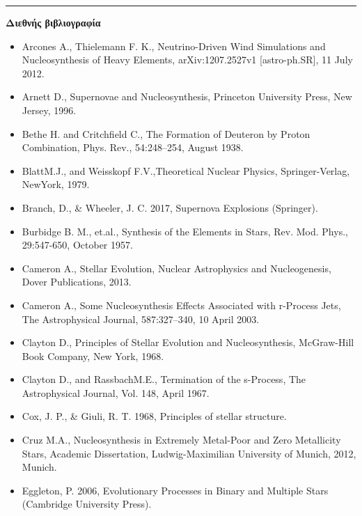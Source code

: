 \hrule
\textbf{Διεθνής βιβλιογραφία}
\begin{itemize}
    
    \item Arcones A., Thielemann F. K., Neutrino-Driven Wind Simulations and Nucleosynthesis of Heavy Elements, arXiv:1207.2527v1 [astro-ph.SR], 11 July 2012.
    
    \item Arnett D., Supernovae and Nucleosynthesis, Princeton University Press, New Jersey, 1996.
    
    \item Bethe H. and Critchfield C., The Formation of Deuteron by Proton Combination, Phys. Rev., 54:248–254, August 1938.
    
    \item BlattM.J., and Weisskopf F.V.,Theoretical Nuclear Physics, Springer-Verlag, NewYork, 1979.
    
    \item Branch, D., \& Wheeler, J. C. 2017, Supernova Explosions (Springer).
    
    \item Burbidge B. M., et.al., Synthesis of the Elements in Stars, Rev. Mod. Phys., 29:547-650, October 1957.
    
    \item Cameron A., Stellar Evolution, Nuclear Astrophysics and Nucleogenesis, Dover Publications, 2013.
    
    \item Cameron A., Some Nucleosynthesis Effects Associated with r-Process Jets, The Astrophysical Journal, 587:327–340, 10 April 2003.
    
    \item Clayton D., Principles of Stellar Evolution and Nucleosynthesis, McGraw-Hill Book Company, New York, 1968.
    
    \item Clayton D., and RassbachM.E., Termination of the s-Process, The Astrophysical Journal, Vol. 148, April 1967.
    
    \item Cox, J. P., \& Giuli, R. T. 1968, Principles of stellar structure.
    
    \item Cruz M.A., Nucleosynthesis in Extremely Metal-Poor and Zero Metallicity Stars, Academic Dissertation, Ludwig-Maximilian University of Munich, 2012, Munich.
    
    \item Eggleton, P. 2006, Evolutionary Processes in Binary and Multiple Stars (Cambridge University Press).
    

\end{itemize}
